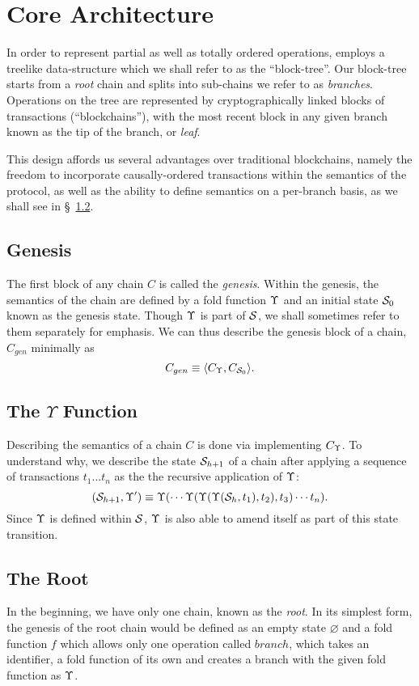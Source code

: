 \section{Core Architecture}

In order to represent partial as well as totally ordered operations, \oscoin{}
employs a treelike data-structure which we shall refer to as the ``block-tree''.
Our block-tree starts from a \emph{root} chain and splits into sub-chains
we refer to as \emph{branches}.  Operations on the tree are represented by
cryptographically linked blocks of transactions (``blockchains''), with the most
recent block in any given branch known as the tip of the branch, or \emph{leaf}.

This design affords us several advantages over traditional blockchains, namely
the freedom to incorporate causally-ordered transactions within the semantics
of the protocol, as well as the ability to define semantics on a per-branch
basis, as we shall see in \S~\ref{fold-function}.

\subsection{Genesis}

The first block of any chain $C$ is called the \emph{genesis}. Within the
genesis, the semantics of the chain are defined by a fold function $\Upsilon$ and
an initial state $\mathcal{S}_0$ known as the genesis state. Though $\Upsilon$ is part
of $\mathcal{S}$, we shall sometimes refer to them separately for emphasis.  We can
thus describe the genesis block of a chain, $C_{gen}$ minimally as
\[
    C_{gen} \equiv \langle C_{\Upsilon}, C_{\mathcal{S}_0} \rangle.
\]

\subsection{The $\Upsilon$ Function} \label{fold-function}

Describing the semantics of a chain $C$ is done via implementing $C_{\Upsilon}$.
To understand why, we describe the state $\mathcal{S}_{h+1}$ of a chain after
applying a sequence of transactions $t_1 \dots t_n$ as the the recursive application of $\Upsilon$:
\[
    (\mathcal{S}_{h+1}, \Upsilon') \equiv \Upsilon(\cdots \Upsilon(\Upsilon(\Upsilon(\mathcal{S}_h,
    t_1), t_2), t_3) \cdots t_n).
\]
Since $\Upsilon$ is defined within $\mathcal{S}$, $\Upsilon$ is also able to amend itself as
part of this state transition.

\subsection{The Root}
In the beginning, we have only one chain, known as the \emph{root}. In its simplest
form, the genesis of the root chain would be defined as an empty state $\varnothing$
and a fold function $f$ which allows only one operation called $branch$, which takes
an identifier, a fold function of its own and creates a branch with the given
fold function as $\Upsilon$.
